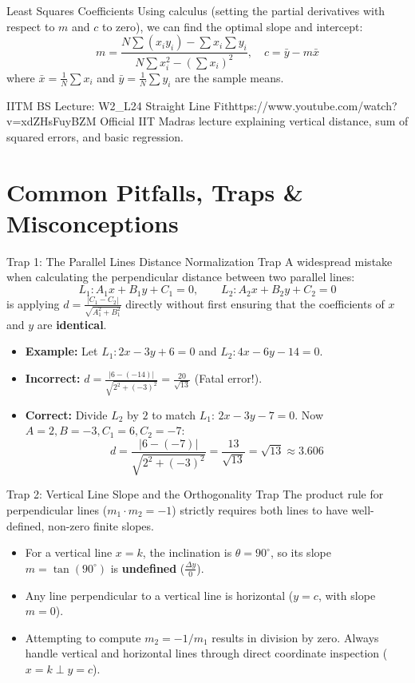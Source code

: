 \begin{theorembox}{Least Squares Coefficients}
Using calculus (setting the partial derivatives with respect to $m$ and $c$ to zero), we can find the optimal slope and intercept:
$$m = \frac{N\sum (x_i y_i) - \sum x_i \sum y_i}{N\sum x_i^2 - (\sum x_i)^2}, \quad c = \bar{y} - m\bar{x}$$
where $\bar{x} = \frac{1}{N}\sum x_i$ and $\bar{y} = \frac{1}{N}\sum y_i$ are the sample means.
\end{theorembox}

\begin{videocard}{IITM BS Lecture: W2\_L24 Straight Line Fit}{https://www.youtube.com/watch?v=xdZHsFuyBZM}
Official IIT Madras lecture explaining vertical distance, sum of squared errors, and basic regression.
\end{videocard}

\section{Common Pitfalls, Traps \& Misconceptions}

\begin{trapbox}{Trap 1: The Parallel Lines Distance Normalization Trap}
A widespread mistake when calculating the perpendicular distance between two parallel lines:
$$L_1: A_1 x + B_1 y + C_1 = 0, \qquad L_2: A_2 x + B_2 y + C_2 = 0$$
is applying $d = \frac{|C_1 - C_2|}{\sqrt{A_1^2 + B_1^2}}$ directly without first ensuring that the coefficients of $x$ and $y$ are \textbf{identical}.
\begin{itemize}
    \item \textbf{Example:} Let $L_1: 2x - 3y + 6 = 0$ and $L_2: 4x - 6y - 14 = 0$.
    \item \textbf{Incorrect:} $d = \frac{|6 - (-14)|}{\sqrt{2^2 + (-3)^2}} = \frac{20}{\sqrt{13}}$ (Fatal error!).
    \item \textbf{Correct:} Divide $L_2$ by $2$ to match $L_1$: $2x - 3y - 7 = 0$. Now $A = 2, B = -3, C_1 = 6, C_2 = -7$:
    $$d = \frac{|6 - (-7)|}{\sqrt{2^2 + (-3)^2}} = \frac{13}{\sqrt{13}} = \sqrt{13} \approx 3.606$$
\end{itemize}
\end{trapbox}

\begin{trapbox}{Trap 2: Vertical Line Slope and the Orthogonality Trap}
The product rule for perpendicular lines ($m_1 \cdot m_2 = -1$) strictly requires both lines to have well-defined, non-zero finite slopes.
\begin{itemize}
    \item For a vertical line $x = k$, the inclination is $\theta = 90^\circ$, so its slope $m = \tan(90^\circ)$ is \textbf{undefined} ($\frac{\Delta y}{0}$).
    \item Any line perpendicular to a vertical line is horizontal ($y = c$, with slope $m = 0$).
    \item Attempting to compute $m_2 = -1 / m_1$ results in division by zero. Always handle vertical and horizontal lines through direct coordinate inspection ($x = k \perp y = c$).
\end{itemize}
\end{trapbox}


